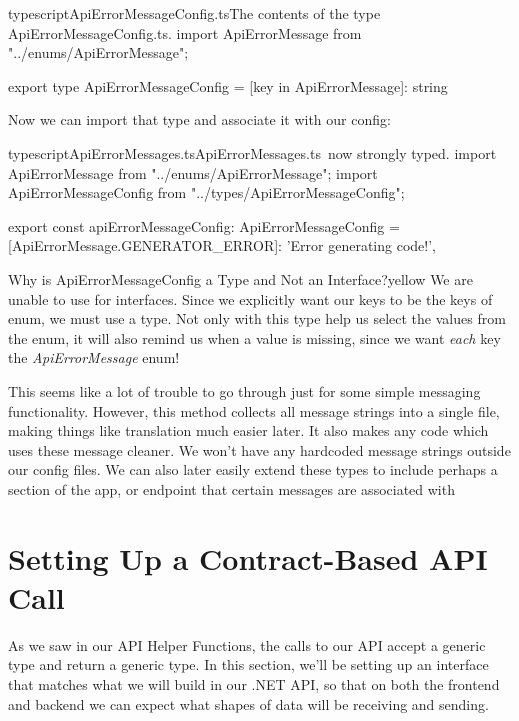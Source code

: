 \documentclass[paper=6in:9in,pagesize=pdftex,headinclude=on,footinclude=on,12pt,twoside]{scrbook}
\begin{document}
\begin{codeInput}{typescript}{ApiErrorMessageConfig.ts}{The contents of the type ApiErrorMessageConfig.ts.}
import ApiErrorMessage from "../enums/ApiErrorMessage";

export type ApiErrorMessageConfig = {
    [key in ApiErrorMessage]: string
}
\end{codeInput}

Now we can import that type and associate it with our config:

\begin{codeInput}{typescript}{ApiErrorMessages.ts}{ApiErrorMessages.ts\, now strongly typed.}
import ApiErrorMessage from "../enums/ApiErrorMessage";
import { ApiErrorMessageConfig } from "../types/ApiErrorMessageConfig";

export const apiErrorMessageConfig: ApiErrorMessageConfig = {
    [ApiErrorMessage.GENERATOR_ERROR]: 'Error generating code!',
}
\end{codeInput}

\begin{highlightBox}{Why is ApiErrorMessageConfig a Type and Not an Interface?}{yellow}{\warning}
We are unable to use  for interfaces. Since we explicitly want our keys to be the keys of  enum, we must use a type. Not only with this type help us select the values from the  enum, it will also remind us when a value is missing, since we want \textit{each} key  the \textit{ApiErrorMessage} enum!
\end{highlightBox}


This seems like a lot of trouble to go through just for some simple messaging functionality. However, this method collects all message strings into a single file, making things like translation much easier later. It also makes any code which uses these message cleaner. We won't have any hardcoded message strings outside our config files. We can also later easily extend these types to include perhaps a section of the app, or endpoint that certain messages are associated with

\section{Setting Up a Contract-Based API Call}\label{contract-based-api}

As we saw in our API Helper Functions, the calls to our API accept a generic type and return a generic type. In this section, we'll be setting up an interface that matches what we will build in our .NET API, so that on both the frontend and backend we can expect what shapes of data will be receiving and sending. 
\end{document}
